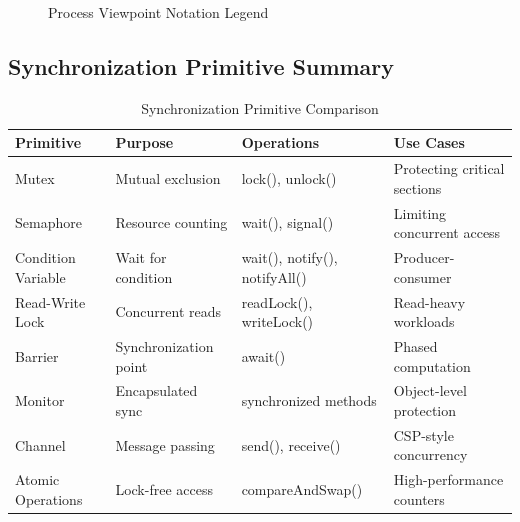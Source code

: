\documentclass[11pt,letterpaper]{article}
\begin{document}
\begin{figure}[H]
\caption{Process Viewpoint Notation Legend}
\end{figure}

\subsection{Synchronization Primitive Summary}

\begin{table}[H]
\centering
\caption{Synchronization Primitive Comparison}
\small
\begin{tabular}{@{}L{2.2cm}L{3.5cm}L{4cm}L{3.5cm}@{}}
\toprule
\textbf{Primitive} & \textbf{Purpose} & \textbf{Operations} & \textbf{Use Cases} \\
\midrule
Mutex & Mutual exclusion & lock(), unlock() & Protecting critical sections \\
\addlinespace
Semaphore & Resource counting & wait(), signal() & Limiting concurrent access \\
\addlinespace
Condition Variable & Wait for condition & wait(), notify(), notifyAll() & Producer-consumer \\
\addlinespace
Read-Write Lock & Concurrent reads & readLock(), writeLock() & Read-heavy workloads \\
\addlinespace
Barrier & Synchronization point & await() & Phased computation \\
\addlinespace
Monitor & Encapsulated sync & synchronized methods & Object-level protection \\
\addlinespace
Channel & Message passing & send(), receive() & CSP-style concurrency \\
\addlinespace
Atomic Operations & Lock-free access & compareAndSwap() & High-performance counters \\
\bottomrule
\end{tabular}
\end{table}
\end{document}
